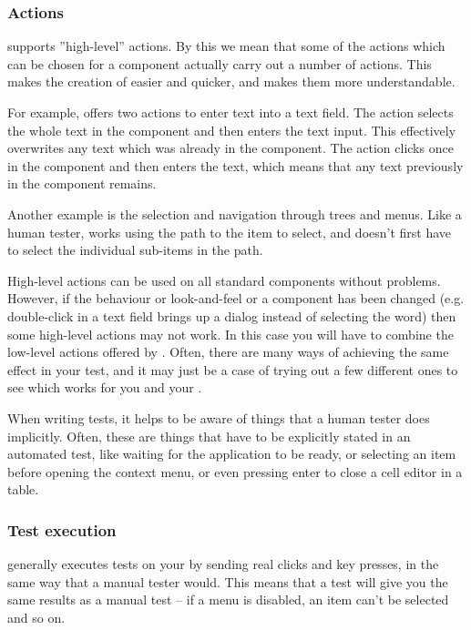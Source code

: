 \subsubsection{Actions}

\app{} supports ''high-level'' actions. By this we mean that some of the actions which can be chosen for a component actually carry out a number of actions. This makes the creation of \gdcases{} easier and quicker, and makes them more understandable. 

For example, \app{} offers two actions to enter text into a text field. The action  selects the whole text in the component and then enters the text input. This effectively overwrites any text which was already in the component. The  action clicks once in the component and then enters the text, which means that any text previously in the component remains. 

Another example is the selection and navigation through trees and menus. Like a human tester, \app{} works using the path to the item to select, and doesn't first have to select the individual sub-items in the path. 

High-level actions can be used on all standard components without problems. However, if the behaviour or look-and-feel or a component has been changed (e.g. double-click in a text field brings up a dialog instead of selecting the word) then some high-level actions may not work. In this case you will have to combine the low-level actions offered by \app{}. Often, there are many ways of achieving the same effect in your test, and it may just be a case of trying out a few different ones to see which works for you and your \gdaut{}. 

When writing tests, it helps to be aware of things that a human tester does implicitly. Often, these are things that have to be explicitly stated in an automated test, like waiting for the application to be ready, or selecting an item before opening the context menu, or even pressing enter to close a cell editor in a table. 

\subsubsection{Test execution}
\app{} generally executes tests on your \gdaut{} by sending real clicks and key presses, in the same way that a manual tester would. This means that a \app{} test will give you the same results as a manual test -- if a menu is disabled, an item can't be selected and so on. 

